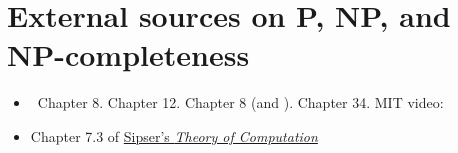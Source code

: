 \documentclass[11pt]{article}
\begin{document}
\section{External sources on P, NP, and NP-completeness}\label{np: sec: external}


\begin{itemize}
\item \DPV~Chapter 8.  \JE Chapter 12. \KT Chapter 8 (and \KWSlides). \CLRS Chapter 34.  MIT video:
  


\item Chapter 7.3 of \href{https://www.google.com/search?client=safari&rls=en&q=sipser+theory+of+computation+3rd+edition+pdf&ie=UTF-8&oe=UTF-8}{Sipser's \emph{Theory of Computation}}

\end{itemize}
\end{document}
